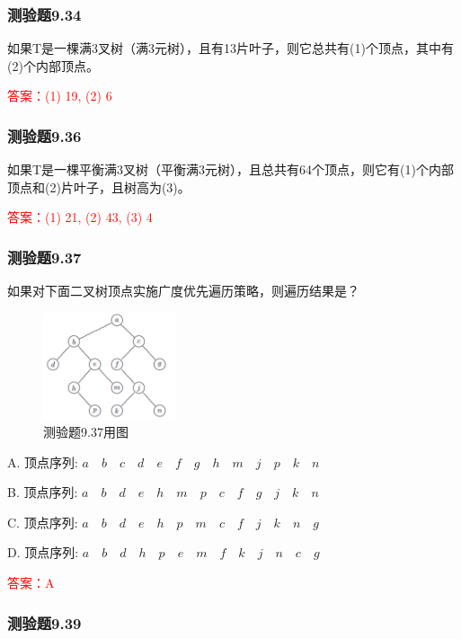 \documentclass[UTF8, heading=true]{ctexart}
\begin{document}
\subsubsection{测验题9.34}

如果T是一棵满3叉树（满3元树），且有13片叶子，则它总共有(1)个顶点，其中有(2)个内部顶点。

\textcolor{red}{答案：(1) 19, (2) 6}

\subsubsection{测验题9.36}

如果T是一棵平衡满3叉树（平衡满3元树），且总共有64个顶点，则它有(1)个内部顶点和(2)片叶子，且树高为(3)。

\textcolor{red}{答案：(1) 21, (2) 43, (3) 4}

\subsubsection{测验题9.37}

如果对下面二叉树顶点实施广度优先遍历策略，则遍历结果是？

\begin{figure}[htbp]
  \centering
  \includegraphics[width=0.35\textwidth]{9.37.png} %
  \caption{测验题9.37用图}
\end{figure}


A. 顶点序列: $a \quad b \quad c \quad d \quad e \quad f \quad g \quad h \quad m \quad j \quad p \quad k \quad n$

B. 顶点序列: $a \quad b \quad d \quad e \quad h \quad m \quad p \quad c \quad f \quad g \quad j \quad k \quad n$

C. 顶点序列: $a \quad b \quad d \quad e \quad h \quad p \quad m \quad c \quad f \quad j \quad k \quad n \quad g$

D. 顶点序列: $a \quad b \quad d \quad h \quad p \quad e \quad m \quad f \quad k \quad j \quad n \quad c \quad g$

\textcolor{red}{答案：A}

\subsubsection{测验题9.39}
\end{document}
